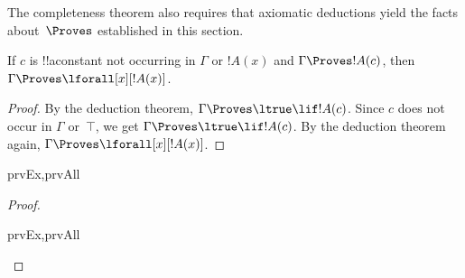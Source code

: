 \documentclass[../../../include/open-logic-section]{subfiles}
\begin{document}


\begin{explain}
  The completeness theorem also requires that axiomatic deductions
  yield the facts about~$\Proves$ established in this section.
\end{explain}

\begin{thm}
 If $c$ is !!a{constant} not occurring
in $\Gamma$ or $!A(x)$ and $\Gamma \Proves !A(c)$, then $\Gamma
\Proves \lforall[x][!A(x)]$.
\end{thm}

\begin{proof}
By the deduction theorem, $\Gamma \Proves \ltrue \lif !A(c)$. Since
$c$ does not occur in $\Gamma$ or~$\top$, we get $\Gamma \Proves
\ltrue \lif !A(c)$. By the deduction theorem again, $\Gamma \Proves
\lforall[x][!A(x)]$.
\end{proof}

\begin{prop}
\begin{tagenumerate}{prvEx,prvAll}

\end{tagenumerate}
\end{prop}

\begin{proof}
\begin{tagenumerate}{prvEx,prvAll}
\end{tagenumerate}
\end{proof}
\end{document}
